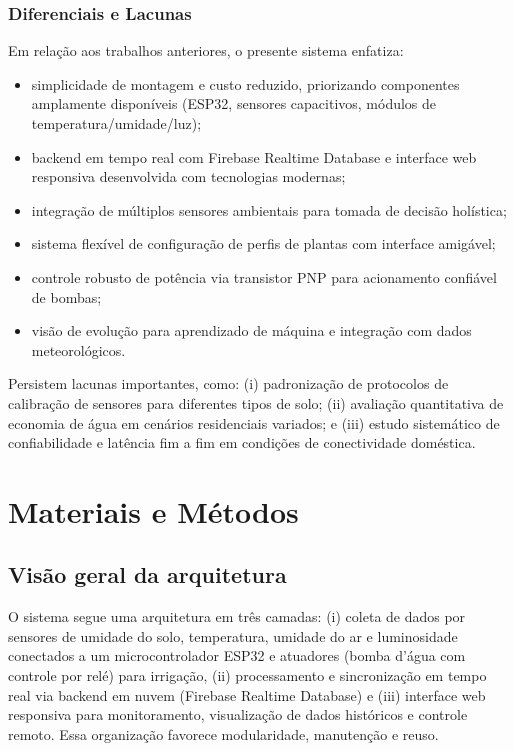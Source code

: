\documentclass[twoside,english,brazilian]{UNISINOSmonografia}
\begin{document}
\subsection{Diferenciais e Lacunas}
Em relação aos trabalhos anteriores, o presente sistema enfatiza:
\begin{itemize}
    \item simplicidade de montagem e custo reduzido, priorizando componentes amplamente disponíveis (ESP32, sensores capacitivos, módulos de temperatura/umidade/luz);
    \item backend em tempo real com Firebase Realtime Database e interface web responsiva desenvolvida com tecnologias modernas;
    \item integração de múltiplos sensores ambientais para tomada de decisão holística;
    \item sistema flexível de configuração de perfis de plantas com interface amigável;
    \item controle robusto de potência via transistor PNP para acionamento confiável de bombas;
    \item visão de evolução para aprendizado de máquina e integração com dados meteorológicos.
\end{itemize}
Persistem lacunas importantes, como: (i) padronização de protocolos de calibração de sensores para diferentes tipos de solo; (ii) avaliação quantitativa de economia de água em cenários residenciais variados; e (iii) estudo sistemático de confiabilidade e latência fim a fim em condições de conectividade doméstica.

\chapter{Materiais e Métodos}

\section{Visão geral da arquitetura}
O sistema segue uma arquitetura em três camadas: (i) coleta de dados por sensores de umidade do solo, temperatura, umidade do ar e luminosidade conectados a um microcontrolador ESP32 e atuadores (bomba d'água com controle por relé) para irrigação, (ii) processamento e sincronização em tempo real via backend em nuvem (Firebase Realtime Database) e (iii) interface web responsiva para monitoramento, visualização de dados históricos e controle remoto. Essa organização favorece modularidade, manutenção e reuso.
\end{document}
